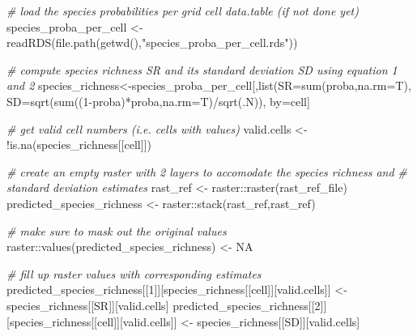 \documentclass[
]{article}
\newenvironment{Shaded}{\begin{snugshade}}{\end{snugshade}}
\newcommand{\AttributeTok}[1]{\textcolor[rgb]{0.77,0.63,0.00}{#1}}
\newcommand{\CommentTok}[1]{\textcolor[rgb]{0.56,0.35,0.01}{\textit{#1}}}
\newcommand{\ConstantTok}[1]{\textcolor[rgb]{0.00,0.00,0.00}{#1}}
\newcommand{\DecValTok}[1]{\textcolor[rgb]{0.00,0.00,0.81}{#1}}
\newcommand{\FunctionTok}[1]{\textcolor[rgb]{0.00,0.00,0.00}{#1}}
\newcommand{\NormalTok}[1]{#1}
\newcommand{\OtherTok}[1]{\textcolor[rgb]{0.56,0.35,0.01}{#1}}
\newcommand{\SpecialCharTok}[1]{\textcolor[rgb]{0.00,0.00,0.00}{#1}}
\newcommand{\StringTok}[1]{\textcolor[rgb]{0.31,0.60,0.02}{#1}}
\begin{document}
\begin{Shaded}
\begin{Highlighting}[]

\CommentTok{\# load the species probabilities per grid cell data.table (if not done yet)}
\NormalTok{species\_proba\_per\_cell }\OtherTok{\textless{}{-}} \FunctionTok{readRDS}\NormalTok{(}\FunctionTok{file.path}\NormalTok{(}\FunctionTok{getwd}\NormalTok{(),}\StringTok{"species\_proba\_per\_cell.rds"}\NormalTok{))}

\CommentTok{\# compute species richness SR and its standard deviation SD using equation 1 and 2}
\NormalTok{species\_richness}\OtherTok{\textless{}{-}}\NormalTok{species\_proba\_per\_cell[,}\FunctionTok{list}\NormalTok{(}\AttributeTok{SR=}\FunctionTok{sum}\NormalTok{(proba,}\AttributeTok{na.rm=}\NormalTok{T),}
                                               \AttributeTok{SD=}\FunctionTok{sqrt}\NormalTok{(}\FunctionTok{sum}\NormalTok{((}\DecValTok{1}\SpecialCharTok{{-}}\NormalTok{proba)}\SpecialCharTok{*}\NormalTok{proba,}\AttributeTok{na.rm=}\NormalTok{T)}\SpecialCharTok{/}\FunctionTok{sqrt}\NormalTok{(.N)),}
                                               \AttributeTok{by=}\NormalTok{cell]}

\CommentTok{\# get valid cell numbers (i.e. cells with values)}
\NormalTok{valid.cells }\OtherTok{\textless{}{-}} \SpecialCharTok{!}\FunctionTok{is.na}\NormalTok{(species\_richness[[}\StringTok{\textquotesingle{}cell\textquotesingle{}}\NormalTok{]])}

\CommentTok{\# create an empty raster with 2 layers to accomodate the species richness and }
\CommentTok{\# standard deviation estimates}
\NormalTok{rast\_ref }\OtherTok{\textless{}{-}}\NormalTok{ raster}\SpecialCharTok{::}\FunctionTok{raster}\NormalTok{(rast\_ref\_file)}
\NormalTok{predicted\_species\_richness }\OtherTok{\textless{}{-}}\NormalTok{ raster}\SpecialCharTok{::}\FunctionTok{stack}\NormalTok{(rast\_ref,rast\_ref)}

\CommentTok{\# make sure to mask out the original values}
\NormalTok{raster}\SpecialCharTok{::}\FunctionTok{values}\NormalTok{(predicted\_species\_richness) }\OtherTok{\textless{}{-}} \ConstantTok{NA} 

\CommentTok{\# fill up raster values with corresponding estimates}
\NormalTok{predicted\_species\_richness[[}\DecValTok{1}\NormalTok{]][species\_richness[[}\StringTok{\textquotesingle{}cell\textquotesingle{}}\NormalTok{]][valid.cells]] }\OtherTok{\textless{}{-}} 
\NormalTok{  species\_richness[[}\StringTok{\textquotesingle{}SR\textquotesingle{}}\NormalTok{]][valid.cells]}
\NormalTok{predicted\_species\_richness[[}\DecValTok{2}\NormalTok{]][species\_richness[[}\StringTok{\textquotesingle{}cell\textquotesingle{}}\NormalTok{]][valid.cells]] }\OtherTok{\textless{}{-}} 
\NormalTok{  species\_richness[[}\StringTok{\textquotesingle{}SD\textquotesingle{}}\NormalTok{]][valid.cells]}
\end{Highlighting}
\end{Shaded}
\end{document}
